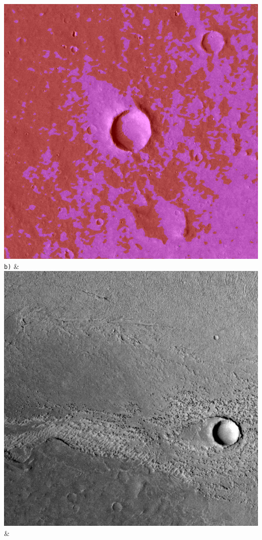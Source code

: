 \begin{table}[h!]
\begin{tabularx}{\textwidth}
		\includegraphics[width=0.9\linewidth]{images/gen/activation_functions/p03_01.png_tanh.png} \\
		\texttt{b)} &
		\includegraphics[width=0.9\linewidth]{images/p03/p03_02.png} &

\end{tabularx}
\end{table}
